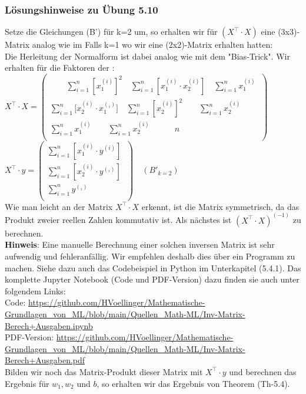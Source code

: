 \documentclass[12pt]{article}
\begin{document}
\subsubsection{Lösungshinweise zu Übung 5.10}
%
Setze die Gleichungen (B') für k=2 um, so erhalten wir für $(X^\top \cdot X)$ eine (3x3)- Matrix analog wie im Falls k=1 wo wir eine (2x2)-Matrix erhalten hatten:\\
Die Herleitung der Normalform ist dabei analog wie mit dem "Bias-Trick". Wir erhalten für die Faktoren der {\color{blue}{Normalform}}:
\\[0.4cm]
\hspace*{-0.5cm}
$ X^\top \cdot X = \left(
  \begin{array}{c}
  \qquad \sum\limits_{i=1}^n [{x_1^{(i)}}]^2 \quad \sum \limits_{i=1}^n [{x_1^{(i)}} \cdot {x_2^{(i)}}] \quad  \sum\limits_{i=1}^n {x_1^{(i)}}  \\
        \sum\limits_{i=1}^n [{x_2^{(i)}} \cdot {{x_1^{(_i)}}] \quad \sum\limits_{i=1}^n [{x_2^{(i)}}]^2} \qquad  \sum\limits_{i=1}^n {x_2^{(i)}} \\
  \sum\limits_{i=1}^n {x_1^{(i)}} \qquad \sum\limits_{i=1}^n {x_2^{(i)}} \quad \qquad n \\
  \end{array}  \
  \right) 
$    
$ X^\top \cdot y = \left(
  \begin{array}{c}
    \sum\limits_{i=1}^n [{x_1^{(i)}} \cdot {{y^{(i)}}}]\\
        \sum\limits_{i=1}^n [{{x_2^{(i)}}} \cdot {{y^{(_i)}}}] \\
    \sum\limits_{i=1}^n {{y^{(_i)}}} \\
  \end{array}  \
  \right) \quad (B'_{k=2})
$     
\\[0.3cm]
Wie man leicht an der Matrix $X^\top \cdot X$ erkennt, ist die Matrix symmetrisch, da das Produkt zweier reellen Zahlen kommutativ ist. Als nächstes ist $(X^\top \cdot X)^{(-1)}$ zu berechnen.\\
\textbf{Hinweis}: Eine manuelle Berechnung einer solchen inversen Matrix ist sehr aufwendig und fehleranfällig. Wir empfehlen deshalb dies über ein Programm zu machen. Siehe dazu auch das Codebeispiel in Python im Unterkapitel (5.4.1). Das komplette Jupyter Notebook (Code und PDF-Version) dazu finden sie auch unter folgendem Links:\\
Code: \url{https://github.com/HVoellinger/Mathematische-Grundlagen_von_ML/blob/main/Quellen_Math-ML/Inv-Matrix-Berech+Ausgaben.ipynb}\\ 
PDF-Version: \url{https://github.com/HVoellinger/Mathematische-Grundlagen_von_ML/blob/main/Quellen_Math-ML/Inv-Matrix-Berech+Ausgaben.pdf} 
\\[0.2cm]
Bilden wir noch das Matrix-Produkt dieser Matrix mit $X^\top \cdot y $ und  berechnen das Ergebnis für $w_1, w_2$ und $b$, so erhalten wir das Ergebnis von Theorem (Th-5.4).
%
\end{document}
